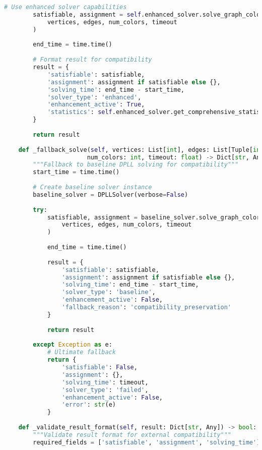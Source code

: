 \begin{lstlisting}[language=Python, caption=Interface Compatibility with Existing Solver Infrastructure]
        # Use enhanced solver capabilities
        satisfiable, assignment = self.enhanced_solver.solve_graph_coloring_with_robustness(
            vertices, edges, num_colors, timeout
        )
        
        end_time = time.time()
        
        # Format result for compatibility
        result = {
            'satisfiable': satisfiable,
            'assignment': assignment if satisfiable else {},
            'solving_time': end_time - start_time,
            'solver_type': 'enhanced',
            'enhancement_active': True,
            'statistics': self.enhanced_solver.get_comprehensive_statistics()
        }
        
        return result
    
    def _fallback_solve(self, vertices: List[int], edges: List[Tuple[int, int]], 
                       num_colors: int, timeout: float) -> Dict[str, Any]:
        """Fallback to baseline DPLL solving for compatibility"""
        start_time = time.time()
        
        # Create baseline solver instance
        baseline_solver = DPLLSolver(verbose=False)
        
        try:
            satisfiable, assignment = baseline_solver.solve_graph_coloring(
                vertices, edges, num_colors, timeout
            )
            
            end_time = time.time()
            
            result = {
                'satisfiable': satisfiable,
                'assignment': assignment if satisfiable else {},
                'solving_time': end_time - start_time,
                'solver_type': 'baseline',
                'enhancement_active': False,
                'fallback_reason': 'compatibility_preservation'
            }
            
            return result
            
        except Exception as e:
            # Ultimate fallback
            return {
                'satisfiable': False,
                'assignment': {},
                'solving_time': timeout,
                'solver_type': 'failed',
                'enhancement_active': False,
                'error': str(e)
            }
    
    def _validate_result_format(self, result: Dict[str, Any]) -> bool:
        """Validate result format for external compatibility"""
        required_fields = ['satisfiable', 'assignment', 'solving_time']
        

\end{lstlisting}
